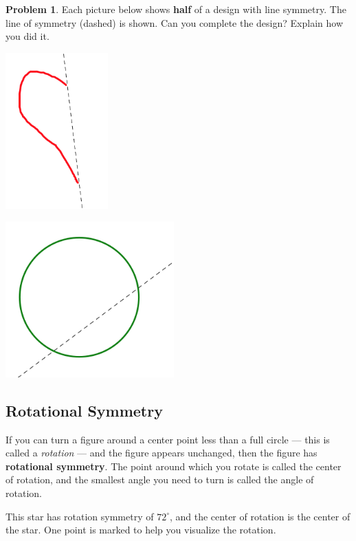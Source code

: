 \documentclass[12pt, reqno]{amsart}
\theoremstyle{remark}
\theoremstyle{definition}
\newtheorem{problem}{Problem}
\numberwithin{equation}{section}  %
\begin{document}
\newpage

\begin{problem}
Each picture below shows {\bf half} of a design with line symmetry.  The line of symmetry (dashed) is shown.  Can you complete the design?  Explain how you did it.

\begin{center}
\includegraphics[height=6cm]{complete1}

\bigskip
\bigskip

\includegraphics[height=6cm]{complete2}

\end{center}

\end{problem}


\newpage
\subsection{Rotational Symmetry}
If you can turn a figure around a center point less than a full circle --- this is called a \emph{rotation} --- and the figure appears unchanged, then the figure has {\bf rotational symmetry}. The point around which you rotate is called the center of rotation, and the smallest angle you need to turn is called the angle of rotation.

This star has rotation symmetry of $72^\circ$, and the center of rotation is the center of the star.  One point is marked to help you visualize the rotation.
\end{document}
